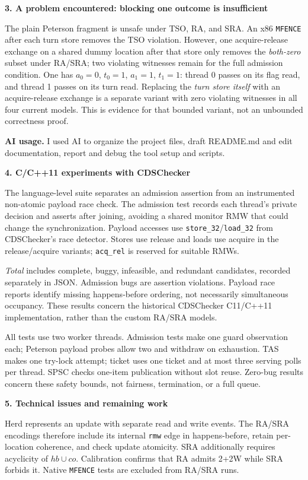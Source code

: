 \documentclass[11pt]{article}
\newcommand{\sect}[1]{\medskip\noindent\textbf{#1}\par\smallskip}
\newcommand{\code}[1]{\texttt{#1}}
\begin{document}
\sect{3. A problem encountered: blocking one outcome is insufficient}
The plain Peterson fragment is unsafe under TSO, RA, and SRA. An x86
\code{MFENCE} after each turn store removes the TSO violation. However, one
acquire-release exchange on a shared dummy location after that store only
removes the \emph{both-zero} subset under RA/SRA; two violating witnesses remain
for the full admission condition. One has $a_0=0$, $t_0=1$, $a_1=1$, $t_1=1$:
thread 0 passes on its flag read, and thread 1 passes on its turn read.
Replacing the \emph{turn store itself} with an acquire-release exchange is a
separate variant with zero violating witnesses in all four current models.
This is evidence for that bounded variant, not an unbounded correctness proof.

\noindent\textbf{AI usage.} I used AI to organize the project files,
draft README.md and edit documentation, report and debug the tool setup and scripts.

\newpage
\sect{4. C/C++11 experiments with CDSChecker}
The language-level suite separates an admission assertion from an instrumented
non-atomic payload race check. The admission test records each thread's private
decision and asserts after joining, avoiding a shared monitor RMW that could
change the synchronization. Payload accesses use \code{store\_32}/\code{load\_32}
from CDSChecker's race detector. Stores use release and loads use acquire in
the release/acquire variants; \code{acq\_rel} is reserved for suitable RMWs.
\begin{center}
\small

\end{center}
\vspace{-4pt}
\emph{Total} includes complete, buggy, infeasible, and redundant candidates,
recorded separately in JSON. Admission bugs are assertion violations. Payload
race reports identify missing happens-before ordering, not necessarily
simultaneous occupancy. These results concern the historical CDSChecker
C11/C++11 implementation, rather than the custom RA/SRA models.

All tests use two worker threads. Admission tests make one guard observation each;
Peterson payload probes allow two and withdraw on exhaustion. TAS makes one
try-lock attempt; ticket uses one ticket and at most three serving polls per
thread. SPSC checks one-item publication without slot reuse. Zero-bug results
concern these safety bounds, not fairness, termination, or a full queue.

\sect{5. Technical issues and remaining work}
Herd represents an update with separate read and write events. The RA/SRA
encodings therefore include its internal \code{rmw} edge in happens-before,
retain per-location coherence, and check update atomicity. SRA additionally
requires acyclicity of $hb\cup co$. Calibration confirms that RA admits 2+2W
while SRA forbids it. Native \code{MFENCE} tests are excluded from RA/SRA runs.
\end{document}
